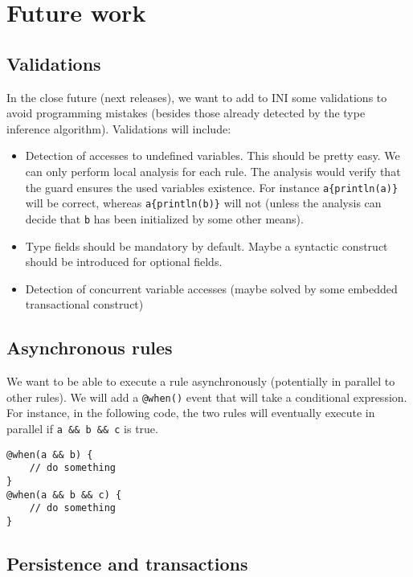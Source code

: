 \documentclass[11pt]{article}
\begin{document}
\section{Future work}

\subsection{Validations}

In the close future (next releases), we want to add to INI some validations to avoid programming mistakes (besides those already detected by the type inference algorithm). Validations will include:

\begin{itemize}
\item Detection of accesses to undefined variables. This should be pretty easy. We can only perform local analysis for each rule. The analysis would verify that the guard ensures the used variables existence. For instance \texttt{a\{println(a)\}} will be correct, whereas \texttt{a\{println(b)\}} will not (unless the analysis can decide that \texttt{b} has been initialized by some other means).
\item Type fields should be mandatory by default. Maybe a syntactic construct should be introduced for optional fields.
\item Detection of concurrent variable accesses (maybe solved by some embedded transactional construct)
\end{itemize}

\subsection{Asynchronous rules}

We want to be able to execute a rule asynchronously (potentially in parallel to other rules). We will add a \texttt{@when()} event that will take a conditional expression. For instance, in the following code, the two rules will eventually execute in parallel if \texttt{a \&\& b \&\& c} is true.

\begin{lstlisting}[numbers=none]
@when(a && b) {
	// do something
}
@when(a && b && c) {
	// do something
}
\end{lstlisting}

\subsection{Persistence and transactions}
\end{document}
